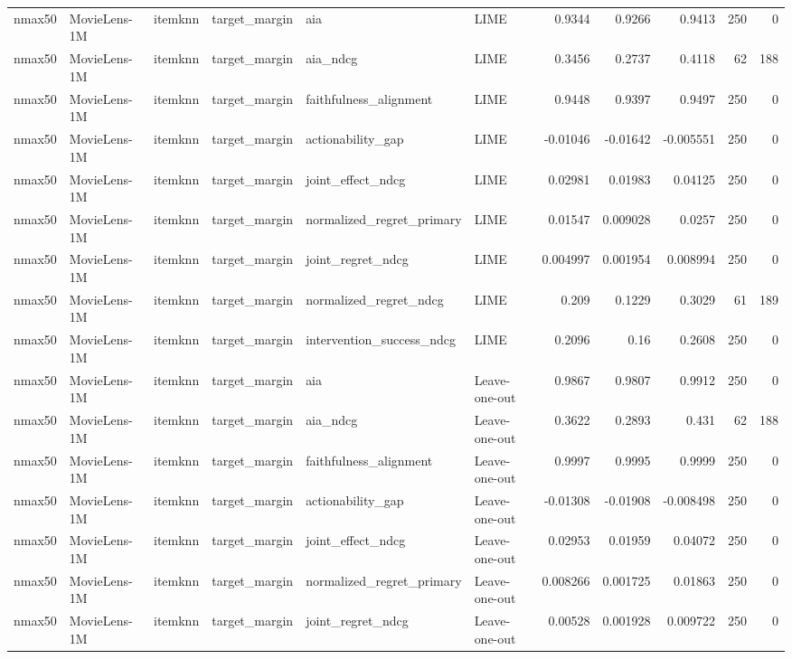 \begin{table}[t]
{\begin{tabular}{llllllrrrrr}
nmax50 & MovieLens-1M & itemknn & target\_margin & aia & LIME & 0.9344 & 0.9266 & 0.9413 & 250 & 0 \\
nmax50 & MovieLens-1M & itemknn & target\_margin & aia\_ndcg & LIME & 0.3456 & 0.2737 & 0.4118 & 62 & 188 \\
nmax50 & MovieLens-1M & itemknn & target\_margin & faithfulness\_alignment & LIME & 0.9448 & 0.9397 & 0.9497 & 250 & 0 \\
nmax50 & MovieLens-1M & itemknn & target\_margin & actionability\_gap & LIME & -0.01046 & -0.01642 & -0.005551 & 250 & 0 \\
nmax50 & MovieLens-1M & itemknn & target\_margin & joint\_effect\_ndcg & LIME & 0.02981 & 0.01983 & 0.04125 & 250 & 0 \\
nmax50 & MovieLens-1M & itemknn & target\_margin & normalized\_regret\_primary & LIME & 0.01547 & 0.009028 & 0.0257 & 250 & 0 \\
nmax50 & MovieLens-1M & itemknn & target\_margin & joint\_regret\_ndcg & LIME & 0.004997 & 0.001954 & 0.008994 & 250 & 0 \\
nmax50 & MovieLens-1M & itemknn & target\_margin & normalized\_regret\_ndcg & LIME & 0.209 & 0.1229 & 0.3029 & 61 & 189 \\
nmax50 & MovieLens-1M & itemknn & target\_margin & intervention\_success\_ndcg & LIME & 0.2096 & 0.16 & 0.2608 & 250 & 0 \\
nmax50 & MovieLens-1M & itemknn & target\_margin & aia & Leave-one-out & 0.9867 & 0.9807 & 0.9912 & 250 & 0 \\
nmax50 & MovieLens-1M & itemknn & target\_margin & aia\_ndcg & Leave-one-out & 0.3622 & 0.2893 & 0.431 & 62 & 188 \\
nmax50 & MovieLens-1M & itemknn & target\_margin & faithfulness\_alignment & Leave-one-out & 0.9997 & 0.9995 & 0.9999 & 250 & 0 \\
nmax50 & MovieLens-1M & itemknn & target\_margin & actionability\_gap & Leave-one-out & -0.01308 & -0.01908 & -0.008498 & 250 & 0 \\
nmax50 & MovieLens-1M & itemknn & target\_margin & joint\_effect\_ndcg & Leave-one-out & 0.02953 & 0.01959 & 0.04072 & 250 & 0 \\
nmax50 & MovieLens-1M & itemknn & target\_margin & normalized\_regret\_primary & Leave-one-out & 0.008266 & 0.001725 & 0.01863 & 250 & 0 \\
nmax50 & MovieLens-1M & itemknn & target\_margin & joint\_regret\_ndcg & Leave-one-out & 0.00528 & 0.001928 & 0.009722 & 250 & 0 \\

\end{tabular}}
\end{table}
